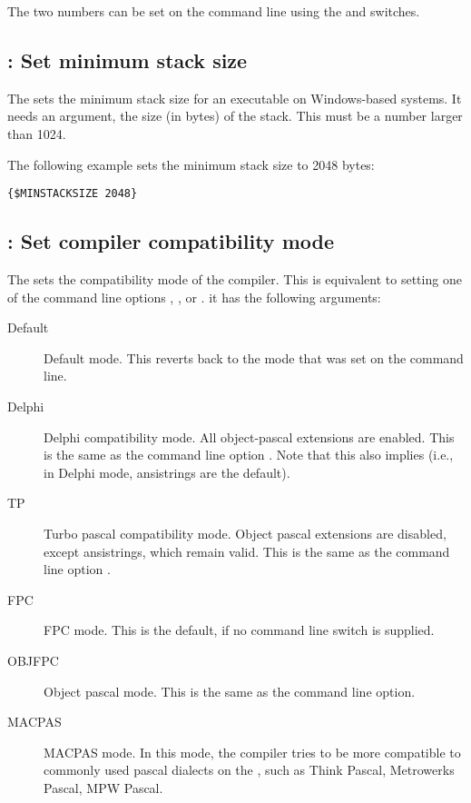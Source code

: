 The two numbers can be set on the command line using the 
and  switches.

\subsection{ : Set minimum stack size}
The  sets the minimum stack size for an executable
on Windows-based systems. It needs an argument, the size (in bytes) of the
stack. This must be a number larger than 1024.

The following example sets the minimum stack size to 2048 bytes:
\begin{verbatim}
{$MINSTACKSIZE 2048}
\end{verbatim}

\subsection{ : Set compiler compatibility mode}

The  sets the compatibility mode of the compiler. This
is equivalent to setting one of the command line options ,
,  or . it has the following arguments:
\begin{description}
\item[Default] Default mode. This reverts back to the mode that was set on
the command line.
\item[Delphi] Delphi compatibility mode. All object-pascal extensions are
enabled. This is the same as the command line option . Note that
this also implies  (i.e., in Delphi mode, ansistrings are
the default).
\item[TP] Turbo pascal compatibility mode. Object pascal extensions are
disabled, except ansistrings, which remain valid.
This is the same as the command line option .
\item[FPC] FPC mode. This is the default, if no command line switch is
supplied.
\item[OBJFPC] Object pascal mode. This is the same as the 
command line option.
\item[MACPAS] MACPAS mode. In this mode, the compiler tries to be more compatible
to commonly used pascal dialects on the \macos, such as Think Pascal, Metrowerks 
Pascal, MPW Pascal. 
\end{description}


